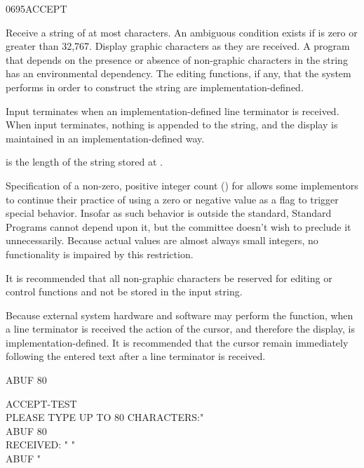 \begin{worddef}{0695}{ACCEPT}
\item {}

	Receive a string of at most  characters. An ambiguous
	condition exists if  is zero or greater than 32,767.
	Display graphic characters as they are received. A program that
	depends on the presence or absence of non-graphic characters in the
	string has an environmental dependency. The editing functions, if
	any, that the system performs in order to construct the string are
	implementation-defined.

	Input terminates when an implementation-defined line terminator is
	received. When input terminates, nothing is appended to the string,
	and the display is maintained in an implementation-defined way.

	 is the length of the string stored at .

	\begin{rationale} %
		Specification of a non-zero, positive integer count ()
		for  allows some implementors to continue their
		practice of using a zero or negative value as a flag to trigger
		special behavior. Insofar as such behavior is outside the
		standard, Standard Programs cannot depend upon it, but the
		committee doesn't wish to preclude it unnecessarily.
		Because actual values are almost always small integers, no
		functionality is impaired by this restriction.

		It is recommended that all non-graphic characters be reserved
		for editing or control functions and not be stored in the input
		string.

		Because external system hardware and software may perform the
		 function, when a line terminator is received the
		action of the cursor, and therefore the display, is
		implementation-defined. It is recommended that the cursor remain
		immediately following the entered text after a line terminator
		is received.
	\end{rationale}

	\begin{testing} %
		\ttfamily
		 ABUF 80  

		\word{:} ACCEPT-TEST \\
		\tab[2]   PLEASE TYPE UP TO 80 CHARACTERS:"  \\
		\tab[2] ABUF 80  \\
		\tab[2]   RECEIVED: " \word{[CHAR]} "  \\
		\tab[2] ABUF   \word{[CHAR]} "   \\
		\word{;}

	\end{testing}
\end{worddef}


